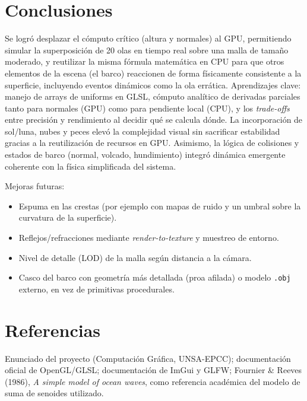 \documentclass[11pt]{article}
\begin{document}
\section{Conclusiones}
Se logró desplazar el cómputo crítico (altura y normales) al GPU, permitiendo
simular la superposición de 20 olas en tiempo real sobre una malla de tamaño
moderado, y reutilizar la misma fórmula matemática en CPU para que otros
elementos de la escena (el barco) reaccionen de forma físicamente
consistente a la superficie, incluyendo eventos dinámicos como la ola
errática. Aprendizajes clave: manejo de arrays de uniforms en GLSL, cómputo
analítico de derivadas parciales tanto para normales (GPU) como para
pendiente local (CPU), y los \emph{trade-offs} entre precisión y
rendimiento al decidir qué se calcula dónde. La incorporación de sol/luna,
nubes y peces elevó la complejidad visual sin sacrificar estabilidad gracias a
la reutilización de recursos en GPU. Asimismo, la lógica de colisiones y
estados de barco (normal, volcado, hundimiento) integró dinámica emergente
coherente con la física simplificada del sistema.

Mejoras futuras:
\begin{itemize}
    \item Espuma en las crestas (por ejemplo con mapas de ruido y un umbral
    sobre la curvatura de la superficie).
    \item Reflejos/refracciones mediante \emph{render-to-texture} y
    muestreo de entorno.
    \item Nivel de detalle (LOD) de la malla según distancia a la cámara.
    \item Casco del barco con geometría más detallada (proa afilada) o
    modelo \texttt{.obj} externo, en vez de primitivas procedurales.
\end{itemize}

\section{Referencias}
Enunciado del proyecto (Computación Gráfica, UNSA-EPCC); documentación
oficial de OpenGL/GLSL; documentación de ImGui y GLFW; Fournier \& Reeves
(1986), \emph{A simple model of ocean waves}, como referencia académica del
modelo de suma de senoides utilizado.
\end{document}
